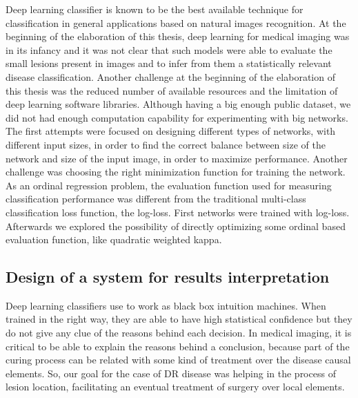Deep learning classifier is known to be the best available technique for classification in general applications based on natural images recognition. At the beginning of the elaboration of this thesis, deep learning for medical imaging was in its infancy and it was not clear that such models were able to evaluate the small lesions present in images and to infer from them a statistically relevant disease classification. Another challenge at the beginning of the elaboration of this thesis was the reduced number of available resources and the limitation of deep learning software libraries. Although having a big enough public dataset, we did not had enough computation capability for experimenting with big networks. The first attempts were focused on designing different types of networks, with different input sizes, in order to find the correct balance between size of the network and size of the input image, in order to maximize performance. Another challenge was choosing the right minimization function for training the network. As an ordinal regression problem, the evaluation function used for measuring classification performance was different from the traditional multi-class classification loss function, the log-loss. First networks were trained with log-loss. Afterwards we explored the possibility of directly optimizing some ordinal based evaluation function, like quadratic weighted kappa. %


\subsection{Design of a system for results interpretation}

Deep learning classifiers use to work as black box intuition machines. When trained in the right way, they are able to have high statistical confidence but they do not give any clue of the reasons behind each decision. In medical imaging, it is critical to be able to explain the reasons behind a conclusion, because part of the curing process can be related with some kind of treatment over the disease causal elements. So, our goal for the case of DR disease was helping in the process of lesion location, facilitating an eventual treatment of surgery over local elements.


